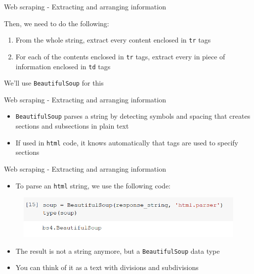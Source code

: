 \documentclass[aspectratio=169]{beamer}
\begin{document}
\begin{frame}{Web scraping - Extracting and arranging information}

	Then, we need to do the following:

	\begin{enumerate}
		\item From the whole string, extract every content enclosed in \texttt{tr} tags
		\item For each of the contents enclosed in \texttt{tr} tags, extract every in piece of information enclosed in \texttt{td} tags
	\end{enumerate}

	We'll use \texttt{BeautifulSoup} for this

\end{frame}

\begin{frame}{Web scraping - Extracting and arranging information}

	\begin{itemize}	
		\item \texttt{BeautifulSoup} parses a string by detecting symbols and spacing that creates sections and subsections in plain text
		\item If used in \texttt{html} code, it knows automatically that tags are used to specify sections
	\end{itemize}

\end{frame}

\begin{frame}{Web scraping - Extracting and arranging information}

	\begin{itemize}
		\item To parse an \texttt{html} string, we use the following code:
	\end{itemize}

	\begin{figure}
		\centering
		\includegraphics[width=0.7\linewidth]{img/bs4_type.png}
	\end{figure}

	\begin{itemize}	
		\item The result is not a string anymore, but a \texttt{BeautifulSoup} data type
		\item You can think of it as a text with divisions and subdivisions
	\end{itemize}

\end{frame}
\end{document}
